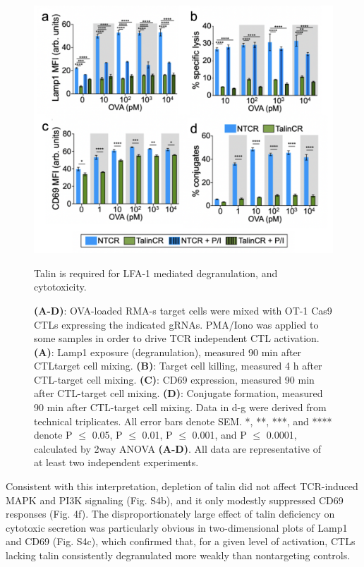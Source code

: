 \begin{figure}[htbp]
	\centering
	\includegraphics[width=1.0\columnwidth]{../figures/chapter3/fig4assays.png}
	\caption{Talin is required for LFA-1 mediated degranulation, and cytotoxicity.}
	\caption*{\textbf{(A-D)}: OVA-loaded RMA-s target cells were mixed with OT-1 Cas9 CTLs expressing the indicated gRNAs. PMA/Iono was applied to some samples in order to drive TCR independent CTL activation. \textbf{(A)}: Lamp1 exposure (degranulation), measured 90 min after CTLtarget cell mixing. \textbf{(B)}: Target cell killing, measured 4 h after CTL-target cell mixing. \textbf{(C)}: CD69 expression, measured 90 min after CTL-target cell mixing. \textbf{(D)}: Conjugate formation, measured 90 min after CTL-target cell mixing. Data in d-g were derived from technical triplicates. All error bars denote SEM. *, **, ***, and **** denote P $\leq$ 0.05, P $\leq$ 0.01, P $\leq$ 0.001, and P $\leq$ 0.0001, calculated by 2way ANOVA \textbf{(A-D)}. All data are representative of at least two independent experiments.}
	\label{fig:fig4assays}
\end{figure} 

Consistent with this interpretation, depletion of talin did not affect TCR-induced MAPK and PI3K signaling (Fig. S4b), and it only modestly suppressed CD69 responses (Fig. 4f). The disproportionately large effect of talin deficiency on cytotoxic secretion was particularly obvious in two-dimensional plots of Lamp1 and CD69 (Fig. S4c), which confirmed that, for a given level of activation, CTLs lacking talin consistently degranulated more weakly than nontargeting controls. 

